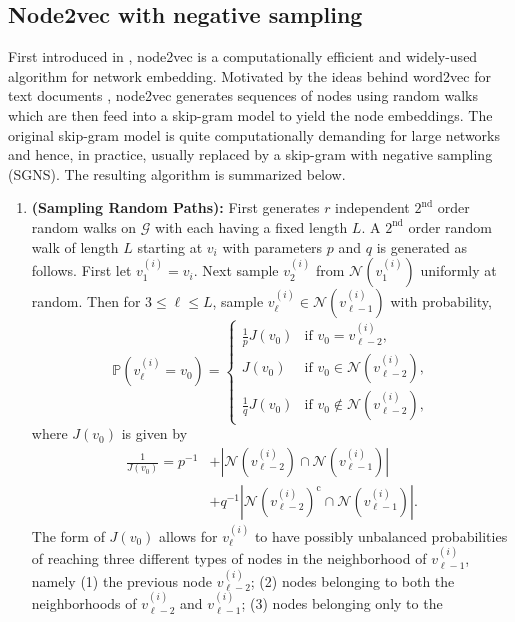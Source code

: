 \documentclass[10pt,journal,compsoc]{IEEEtran}
\newcommand*{\p}{\mathbb{P}}
\newcommand{\ee}{\end{aligned} \end{equation}}
\newcommand{\bee}{\begin{equation}\begin{aligned}}
\numberwithin{equation}{section}
\begin{document}
\subsection{Node2vec with negative sampling}\label{sec:node2vec}
First introduced in \cite{grover2016node2vec}, node2vec is a
computationally efficient and widely-used algorithm for network
embedding. Motivated by the ideas behind word2vec for text
documents \cite{mikolov2013distributed}, node2vec generates sequences of nodes using random walks which are then feed into a skip-gram
model \cite{Tomas2013ICLR} to yield the node embeddings. The original
skip-gram model is quite computationally demanding for large networks
and hence, in practice, usually replaced by a skip-gram with
negative sampling (SGNS). The resulting algorithm is 
summarized below.
\begin{enumerate}
\item {\bf (Sampling Random Paths):} First
  generates $r$ independent $2^{\mathrm{nd}}$ order random walks on $\mathcal{G}$ with each
  having a fixed length $L$. 
  A $2^{\mathrm{nd}}$ order
random walk of length $L$ starting at $v_i$ with parameters $p$ and $q$ is generated
as follows. First let $v_1^{(i)} = v_i$. 
Next sample $v^{(i)}_2$ from
$\mathcal{N}(v_1^{(i)})$ uniformly at random.
Then for $3 \leq \ell \leq L$, sample $v^{(i)}_{\ell} \in \mathcal{N}(v^{(i)}_{\ell-1})$ with probability,
\begin{equation*}
\p(v^{(i)}_{\ell} = v_0) 
= 
\begin{cases}
\frac{1}{p}J(v_0) & \text{if $v_0 = v^{(i)}_{\ell-2}$},\\
J(v_0)& \text{if $v_0  \in \mathcal{N}(v^{(i)}_{\ell-2})$},\\
\frac{1}{q}J(v_0)  & \text{if $v_0  \not \in \mathcal{N}(v^{(i)}_{\ell-2})$},
\end{cases} 
\end{equation*}
where $J(v_0)$ is given by
\bee
\frac{1}{J(v_0)} = 
 p^{-1} &+ |\mathcal{N}(v^{(i)}_{\ell-2}) \cap
\mathcal{N}(v^{(i)}_{\ell-1})| \\ & +
q^{-1}|\mathcal{N}(v^{(i)}_{\ell-2})^{\mathrm{c}} \cap
\mathcal{N}(v^{(i)}_{\ell-1})|\Bigr.
\ee
The form of $J(v_0)$ allows for $v_{\ell}^{(i)}$ to have possibly unbalanced
  probabilities of reaching three different types of nodes in the
  neighborhood of $v_{\ell-1}^{(i)}$, namely (1) the previous node
  $v_{\ell-2}^{(i)}$; (2) nodes belonging to both the neighborhoods of
  $v_{\ell-2}^{(i)}$ and $v_{\ell-1}^{(i)}$;  (3) nodes belonging only to the

\end{enumerate}
\end{document}
